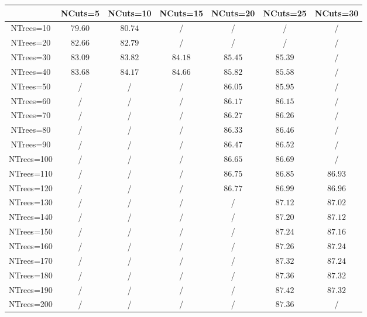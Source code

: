 \centering
\begin{tabular}{|c|c|c|c|c|c|c|} \hline
 & NCuts=5 & NCuts=10 & NCuts=15 & NCuts=20 & NCuts=25 & NCuts=30\\\hline
NTrees=10 & $79.60$ & $80.74$ &  / &  / &  / &  /\\\hline
NTrees=20 & $82.66$ & $82.79$ &  / &  / &  / &  /\\\hline
NTrees=30 & $83.09$ & $83.82$ & $84.18$ & $85.45$ & $85.39$ &  /\\\hline
NTrees=40 & $83.68$ & $84.17$ & $84.66$ & $85.82$ & $85.58$ &  /\\\hline
NTrees=50 &  / &  / &  / & $86.05$ & $85.95$ &  /\\\hline
NTrees=60 &  / &  / &  / & $86.17$ & $86.15$ &  /\\\hline
NTrees=70 &  / &  / &  / & $86.27$ & $86.26$ &  /\\\hline
NTrees=80 &  / &  / &  / & $86.33$ & $86.46$ &  /\\\hline
NTrees=90 &  / &  / &  / & $86.47$ & $86.52$ &  /\\\hline
NTrees=100 &  / &  / &  / & $86.65$ & $86.69$ &  /\\\hline
NTrees=110 &  / &  / &  / & $86.75$ & $86.85$ & $86.93$\\\hline
NTrees=120 &  / &  / &  / & $86.77$ & $86.99$ & $86.96$\\\hline
NTrees=130 &  / &  / &  / &  / & $87.12$ & $87.02$\\\hline
NTrees=140 &  / &  / &  / &  / & $87.20$ & $87.12$\\\hline
NTrees=150 &  / &  / &  / &  / & $87.24$ & $87.16$\\\hline
NTrees=160 &  / &  / &  / &  / & $87.26$ & $87.24$\\\hline
NTrees=170 &  / &  / &  / &  / & $87.32$ & $87.24$\\\hline
NTrees=180 &  / &  / &  / &  / & $87.36$ & $87.32$\\\hline
NTrees=190 &  / &  / &  / &  / & $87.42$ & $87.32$\\\hline
NTrees=200 &  / &  / &  / &  / & $87.36$ &  /\\\hline
\end{tabular}
